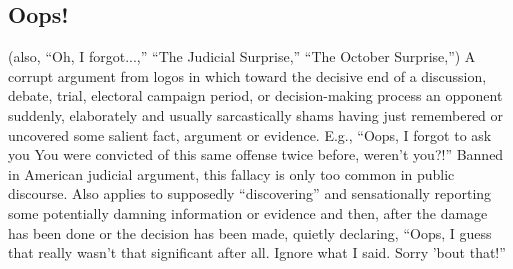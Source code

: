 \documentclass[10pt,a4paper,british]{article}
\begin{document}
\begin{multicols}{2}
    \subsection{Oops!} (also, ``Oh, I forgot...,'' ``The Judicial Surprise,''
    ``The October Surprise,'') A corrupt argument from logos in which toward
    the decisive end of a discussion, debate, trial, electoral campaign period,
    or decision{-}making process an opponent suddenly, elaborately and usually
    sarcastically shams having just remembered or uncovered some salient fact,
    argument or evidence.  E.g., ``Oops, I forgot to ask you  You were
    convicted of this same offense twice before, weren't you?!'' Banned in
    American judicial argument, this fallacy is only too common in public
    discourse. Also applies to supposedly ``discovering'' and sensationally
    reporting some potentially damning information or evidence and then, after
    the damage has been done or the decision has been made, quietly declaring,
    ``Oops, I guess that really wasn't that significant after all. Ignore what
    I said. Sorry 'bout that!'' 


\end{multicols}
\end{document}
